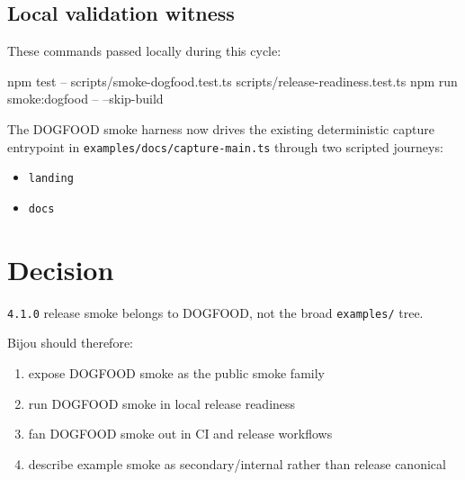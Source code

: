 \subsection{Local validation witness}\label{record-201-local-validation-witness}

These commands passed locally during this cycle:

\begin{CodeBlock}
npm test -- scripts/smoke-dogfood.test.ts scripts/release-readiness.test.ts
npm run smoke:dogfood -- --skip-build
\end{CodeBlock}

The DOGFOOD smoke harness now drives the existing deterministic capture entrypoint in \texttt{e\allowbreak{}x\allowbreak{}a\allowbreak{}m\allowbreak{}p\allowbreak{}l\allowbreak{}e\allowbreak{}s\allowbreak{}/\allowbreak{}d\allowbreak{}o\allowbreak{}c\allowbreak{}s\allowbreak{}/\allowbreak{}c\allowbreak{}a\allowbreak{}p\allowbreak{}t\allowbreak{}u\allowbreak{}r\allowbreak{}e\allowbreak{}-\allowbreak{}m\allowbreak{}a\allowbreak{}i\allowbreak{}n\allowbreak{}.\allowbreak{}t\allowbreak{}s} through two scripted journeys:

\begin{itemize}
\tightlist
\item
  \texttt{l\allowbreak{}a\allowbreak{}n\allowbreak{}d\allowbreak{}i\allowbreak{}n\allowbreak{}g}
\item
  \texttt{d\allowbreak{}o\allowbreak{}c\allowbreak{}s}
\end{itemize}

\section{Decision}\label{record-201-decision}

\texttt{4\allowbreak{}.\allowbreak{}1\allowbreak{}.\allowbreak{}0} release smoke belongs to DOGFOOD, not the broad \texttt{e\allowbreak{}x\allowbreak{}a\allowbreak{}m\allowbreak{}p\allowbreak{}l\allowbreak{}e\allowbreak{}s\allowbreak{}/} tree.

Bijou should therefore:

\begin{enumerate}
\def\labelenumi{\arabic{enumi}.}
\tightlist
\item
  expose DOGFOOD smoke as the public smoke family
\item
  run DOGFOOD smoke in local release readiness
\item
  fan DOGFOOD smoke out in CI and release workflows
\item
  describe example smoke as secondary/internal rather than release canonical
\end{enumerate}

